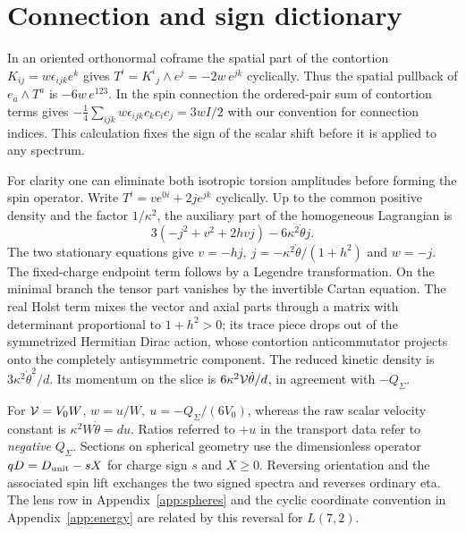 \section{Connection and sign dictionary}\label{app:conv}
In an oriented orthonormal coframe the spatial part of the contortion \(K_{ij}=w\epsilon_{ijk}e^k\) gives \(T^i=K^i{}_j\wedge e^j=-2w\,e^{jk}\) cyclically. Thus the spatial pullback of \(e_a\wedge T^a\) is \(-6w\,e^{123}\). In the spin connection the ordered-pair sum of contortion terms gives \(-\tfrac14\sum_{ijk}w\epsilon_{ijk}c_kc_ic_j=3wI/2\) with our convention for connection indices. This calculation fixes the sign of the scalar shift before it is applied to any spectrum.

For clarity one can eliminate both isotropic torsion amplitudes before forming the spin operator. Write \(T^i=v e^{0i}+2j e^{jk}\) cyclically. Up to the common positive density and the factor \(1/\kappa^2\), the auxiliary part of the homogeneous Lagrangian is
\[
 3(-j^2+v^2+2hvj)-6\kappa^2\dot\theta j .
\]
The two stationary equations give \(v=-hj,\ j=-\kappa^2\dot\theta/(1+h^2)\) and \(w=-j\). The fixed-charge endpoint term follows by a Legendre transformation. On the minimal branch the tensor part vanishes by the invertible Cartan equation. The real Holst term mixes the vector and axial parts through a matrix with determinant proportional to \(1+h^2>0\); its trace piece drops out of the symmetrized Hermitian Dirac action, whose contortion anticommutator projects onto the completely antisymmetric component. The reduced kinetic density is \(3\kappa^2\dot\theta^2/d\). Its momentum on the slice is \(6\kappa^2\mathcal V\dot\theta/d\), in agreement with \(-Q_\Sigma\).

For \(\mathcal V=V_0W\), \(w=u/W,\ u=-Q_\Sigma/(6V_0)\), whereas the raw scalar velocity constant is \(\kappa^2 W\dot\theta=d u\). Ratios referred to \(+u\) in the transport data refer to \emph{negative} \(Q_\Sigma\). Sections on spherical geometry use the dimensionless operator \(qD=D_{\rm unit}-sX\) for charge sign \(s\) and \(X\ge0\). Reversing orientation and the associated spin lift exchanges the two signed spectra and reverses ordinary eta. The lens row in Appendix~\ref{app:spheres} and the cyclic coordinate convention in Appendix~\ref{app:energy} are related by this reversal for \(L(7,2)\).
